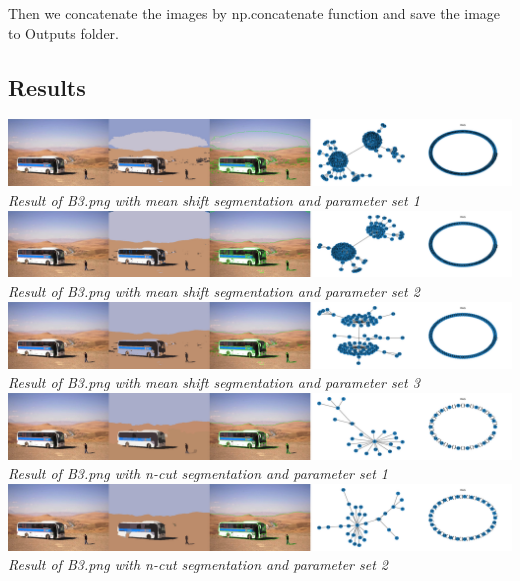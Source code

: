\documentclass[conference]{IEEEtran}
\begin{document}
Then we concatenate the images by np.concatenate function and save the image to Outputs folder.

\newpage

\onecolumn
\subsection{Results}

\includegraphics[width=0.9\linewidth]{B3_algorithm_meanshift_parameterset_1.png}
\\
\textit{Result of B3.png with mean shift segmentation and parameter set 1}\\

\includegraphics[width=0.9\linewidth]{B3_algorithm_meanshift_parameterset_2.png}
\\
\textit{Result of B3.png with mean shift segmentation and parameter set 2}\\

\includegraphics[width=0.9\linewidth]{B3_algorithm_meanshift_parameterset_3.png}
\\
\textit{Result of B3.png with mean shift segmentation and parameter set 3}\\

\includegraphics[width=0.9\linewidth]{B3_algorithm_ncut_parameterset_1.png}
\\
\textit{Result of B3.png with n-cut segmentation and parameter set 1}\\

\includegraphics[width=0.9\linewidth]{B3_algorithm_ncut_parameterset_2.png}
\\
\textit{Result of B3.png with n-cut segmentation and parameter set 2}\\
\end{document}
